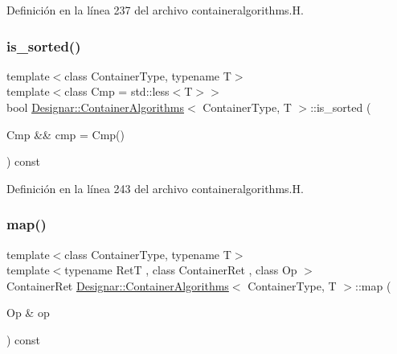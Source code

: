 Definición en la línea 237 del archivo containeralgorithms.\+H.

\mbox{\label{class_designar_1_1_container_algorithms_ae0960afa05917d880b2d7e0f61620f9d}} 
\subsubsection{\texorpdfstring{is\+\_\+sorted()}{is\_sorted()}\hspace{0.1cm}{\footnotesize\ttfamily [2/2]}}
{\footnotesize\ttfamily template$<$class Container\+Type, typename T$>$ \\
template$<$class Cmp  = std\+::less$<$\+T$>$$>$ \\
bool \hyperlink{class_designar_1_1_container_algorithms}{Designar\+::\+Container\+Algorithms}$<$ Container\+Type, T $>$\+::is\+\_\+sorted (\begin{DoxyParamCaption}\item[{Cmp \&\&}]{cmp = {\ttfamily Cmp()} }\end{DoxyParamCaption}) const\hspace{0.3cm}{\ttfamily [inline]}}



Definición en la línea 243 del archivo containeralgorithms.\+H.

\mbox{\label{class_designar_1_1_container_algorithms_a3b9044a197e4ceec6a1de03de197a293}} 
\subsubsection{\texorpdfstring{map()}{map()}\hspace{0.1cm}{\footnotesize\ttfamily [1/2]}}
{\footnotesize\ttfamily template$<$class Container\+Type, typename T$>$ \\
template$<$typename RetT , class Container\+Ret , class Op $>$ \\
Container\+Ret \hyperlink{class_designar_1_1_container_algorithms}{Designar\+::\+Container\+Algorithms}$<$ Container\+Type, T $>$\+::map (\begin{DoxyParamCaption}\item[{Op \&}]{op }\end{DoxyParamCaption}) const\hspace{0.3cm}{\ttfamily [inline]}}




